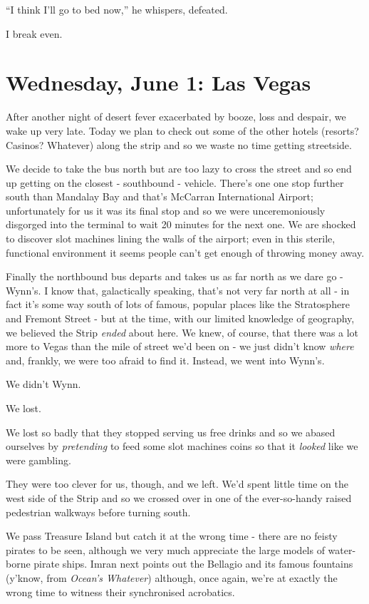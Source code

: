 \documentclass[a5paper,titlepage,11pt,draft]{book}
\begin{document}
``I think I'll go to bed now,'' he whispers, defeated.

I break even.

\chapter[Las Vegas]{Wednesday, June 1: Las Vegas}
After another night of desert fever exacerbated by booze, loss and despair, we wake up very late.  Today we plan to check out some of the other hotels (resorts? Casinos?  Whatever) along the strip and so we waste no time getting streetside.

We decide to take the bus north but are too lazy to cross the street and so end up getting on the closest - southbound - vehicle.  There's one one stop further south than Mandalay Bay and that's McCarran International Airport; unfortunately for us it was its final stop and so we were unceremoniously disgorged into the terminal to wait 20 minutes for the next one.  We are shocked to discover slot machines lining the walls of the airport; even in this sterile, functional environment it seems people can't get enough of throwing money away.

Finally the northbound bus departs and takes us as far north as we dare go - Wynn's.  I know that, galactically speaking, that's not very far north at all - in fact it's some way south of lots of famous, popular places like the Stratosphere and Fremont Street - but at the time, with our limited knowledge of geography, we believed the Strip \emph{ended} about here.  We knew, of course, that there was a lot more to Vegas than the mile of street we'd been on - we just didn't know \emph{where} and, frankly, we were too afraid to find it.  Instead, we went into Wynn's.

We didn't Wynn.

We lost.

We lost so badly that they stopped serving us free drinks and so we abased ourselves by \emph{pretending} to feed some slot machines coins so that it \emph{looked} like we were gambling.

They were too clever for us, though, and we left.  We'd spent little time on the west side of the Strip and so we crossed over in one of the ever-so-handy raised pedestrian walkways before turning south.

We pass Treasure Island but catch it at the wrong time - there are no feisty pirates to be seen, although we very much appreciate the large models of water-borne pirate ships.  Imran next points out the Bellagio and its famous fountains (y'know, from \emph{Ocean's Whatever}) although, once again, we're at exactly the wrong time to witness their synchronised acrobatics.
\end{document}
